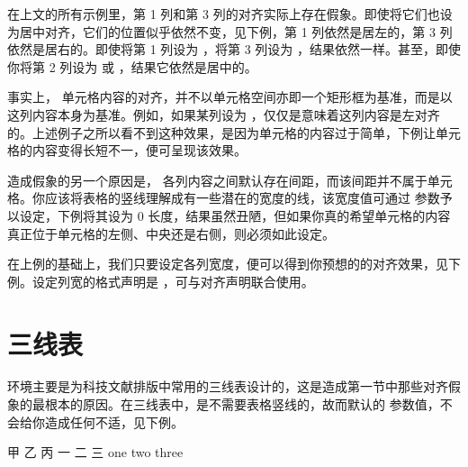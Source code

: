 在上文的所有示例里，第 1 列和第 3 列的对齐实际上存在假象。即使将它们也设为居中对齐，它们的位置似乎依然不变，见下例，第 1 列依然是居左的，第 3 列依然是居右的。即使将第 1 列设为 ，将第 3 列设为 ，结果依然一样。甚至，即使你将第 2 列设为  或 ，结果它依然是居中的。

\startexample
\starttabulate[|c|l|c|]
   \VL\NR
{}   \VL\NR
\stoptabulate
\stopexample
\simpleexample[option=TEX]{\getexample}

事实上， 单元格内容的对齐，并不以单元格空间亦即一个矩形框为基准，而是以这列内容本身为基准。例如，如果某列设为 ，仅仅是意味着这列内容是左对齐的。上述例子之所以看不到这种效果，是因为单元格的内容过于简单，下例让单元格的内容变得长短不一，便可呈现该效果。

\startexample
\starttabulate[|r|c|l|]
   \VL\NR
{}   \VL\NR
\stoptabulate
\stopexample
\simpleexample[option=TEX]{\getexample}

造成假象的另一个原因是， 各列内容之间默认存在间距，而该间距并不属于单元格。你应该将表格的竖线理解成有一些潜在的宽度的线，该宽度值可通过  参数予以设定，下例将其设为 0 长度，结果虽然丑陋，但如果你真的希望单元格的内容真正位于单元格的左侧、中央还是右侧，则必须如此设定。

\startexample
\starttabulate[|r|c|l|][unit=0mm]
   \VL\NR
{}   \VL\NR
\stoptabulate
\stopexample
\simpleexample[option=TEX]{\getexample}

在上例的基础上，我们只要设定各列宽度，便可以得到你预想的的对齐效果，见下例。设定列宽的格式声明是 ，可与对齐声明联合使用。

\startexample
\starttabulate[|rw(2cm)|cw(1cm)|lw(1.5cm)|][unit=0mm]
   \VL\NR
{}   \VL\NR
\stoptabulate
\stopexample
\simpleexample[option=TEX]{\getexample}

\section{三线表}

 环境主要是为科技文献排版中常用的三线表设计的，这是造成第一节中那些对齐假象的最根本的原因。在三线表中，是不需要表格竖线的，故而默认的  参数值，不会给你造成任何不适，见下例。

\startexample
\starttabulate[|c|c|c|]
\HL
\NC 甲 \NC 乙 \NC 丙 \NR
\HL
\NC 一 \NC 二 \NC 三 \NR
\NC one \NC two \NC three \NR
\HL
\stoptabulate
\stopexample
\simpleexample[option=TEX]{\getexample}

